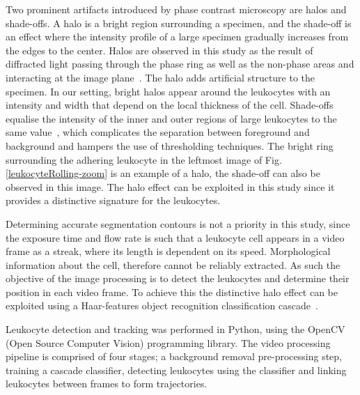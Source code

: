 Two prominent artifacts introduced by phase contrast microscopy are halos and shade-offs. A halo is a bright region surrounding a specimen, and the shade-off is an effect where the intensity profile of a large specimen gradually increases from the edges to the center. Halos are observed in this study as the result of diffracted light passing through the phase ring as well as the non-phase areas and interacting at the image plane~\cite{Yin2012}. The halo adds artificial structure to the specimen. In our setting, bright halos appear around the leukocytes with an intensity and width that depend on the local thickness of the cell. Shade-offs equalise the intensity of the inner and outer regions of large leukocytes to the same value~\cite{Otaki2000}, which complicates the separation between foreground and background and hampers the use of thresholding techniques. The bright ring surrounding the adhering leukocyte in the leftmost image of Fig.\ref{leukocyteRolling-zoom} is an example of a halo, the shade-off can also be observed in this image. The halo effect can be exploited in this study since it provides a distinctive signature for the leukocytes.

Determining accurate segmentation contours is not a priority in this study, since the exposure time and flow rate is such that a leukocyte cell appears in a video frame as a streak, where its length is dependent on its speed. Morphological information about the cell, therefore cannot be reliably extracted. As such the objective of the image processing is to detect the leukocytes and determine their position in each video frame. To achieve this the distinctive halo effect can be exploited using a Haar-features object recognition classification cascade~\cite{Lienhart2002}. 

Leukocyte detection and tracking was performed in Python, using the OpenCV (Open Source Computer Vision) programming library. The video processing pipeline is comprised of four stages; a background removal pre-processing step, training a cascade classifier, detecting leukocytes using the classifier and linking leukocytes between frames to form trajectories. 

